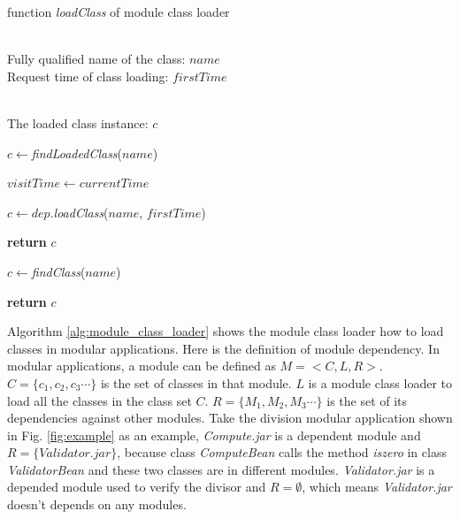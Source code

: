 \documentclass[conference]{IEEEtran}
\begin{document}
\begin{algorithm}[ht]
\caption{function \emph{loadClass} of module class loader}
\label{alg:module_class_loader}
\begin{algorithmic}[1]
\REQUIRE ~~\\
Fully qualified name of the class: $name$ \\
Request time of class loading: $firstTime$

\ENSURE ~~\\
The loaded class instance: $c$

\STATE $c\leftarrow$\emph{findLoadedClass}($name$)


	\STATE $visitTime\leftarrow currentTime$
	
		
		\STATE $c\leftarrow dep.$\emph{loadClass}($name$, $firstTime$)
		
			
			\STATE \textbf{return} $c$

		\ENDIF
	
	\ENDFOR

	\STATE $c\leftarrow$\emph{findClass}($name$)

\ELSE
	
	\STATE \textbf{return} $c$

\ENDIF


\end{algorithmic}
\end{algorithm}


Algorithm \ref{alg:module_class_loader} shows the module class loader how to load classes in modular applications.
Here is the definition of module dependency.
In modular applications, a module can be defined as $M=<C, L, R>$. 
$C=\{c_1, c_2, c_3\cdots\}$ is the set of classes in that module. 
$L$ is a module class loader to load all the classes in the class set $C$.
$R=\{M_1, M_2, M_3\cdots\}$ is the set of its dependencies against other modules. 
Take the division modular application shown in Fig. \ref{fig:example} as an example, \emph{Compute.jar} is a dependent module and $R = \{Validator.jar\}$, because class \emph{ComputeBean} calls the method \emph{iszero} in class \emph{ValidatorBean} and these two classes are in different modules.
\emph{Validator.jar} is a depended module used to verify the divisor and $R = \emptyset$, which means \emph{Validator.jar} doesn't depends on any modules.
\end{document}
